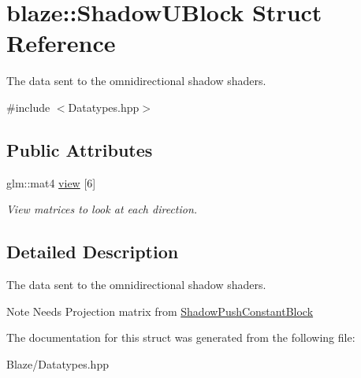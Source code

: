\hypertarget{structblaze_1_1ShadowUBlock}{}\section{blaze\+:\+:Shadow\+U\+Block Struct Reference}
\label{structblaze_1_1ShadowUBlock}


The data sent to the omnidirectional shadow shaders.  




{\ttfamily \#include $<$Datatypes.\+hpp$>$}

\subsection*{Public Attributes}
\begin{DoxyCompactItemize}
\item 
\mbox{\label{structblaze_1_1ShadowUBlock_ad2b3099b1e0880eb3d2b09684fa9cf51}} 
glm\+::mat4 \hyperlink{structblaze_1_1ShadowUBlock_ad2b3099b1e0880eb3d2b09684fa9cf51}{view} \mbox{[}6\mbox{]}
\begin{DoxyCompactList}\small\item\em View matrices to look at each direction. \end{DoxyCompactList}\end{DoxyCompactItemize}


\subsection{Detailed Description}
The data sent to the omnidirectional shadow shaders. 

\begin{DoxyNote}{Note}
Needs Projection matrix from \hyperlink{structblaze_1_1ShadowPushConstantBlock}{Shadow\+Push\+Constant\+Block} 
\end{DoxyNote}


The documentation for this struct was generated from the following file\+:\begin{DoxyCompactItemize}
\item 
Blaze/Datatypes.\+hpp\end{DoxyCompactItemize}

